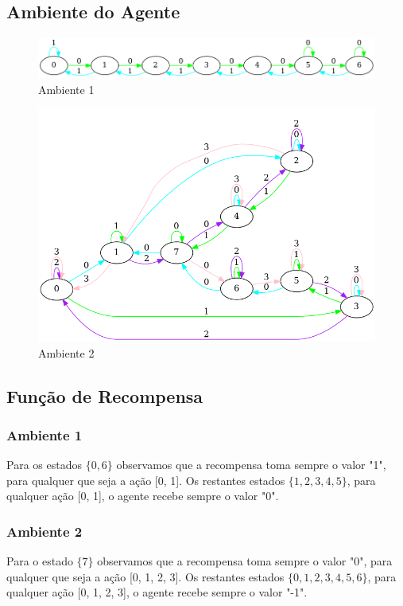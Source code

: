 \documentclass[9pt, a4paper, twocolumn]{article}
\begin{document}
\subsection{Ambiente do Agente}
\begin{figure}[h!]
	\includegraphics[scale=.3]{images/ex1.png}
	\caption{Ambiente 1}
	\label{fig:ex1}
\end{figure}
\begin{figure}[h!]
	\includegraphics[scale=.3]{images/ex2.png}
	\caption{Ambiente 2}
	\label{fig:ex1}
\end{figure}
\subsection{Função de Recompensa}
\subsubsection{Ambiente 1}
\hspace{10mm} Para os estados $\{0, 6\}$ observamos que a recompensa toma sempre o valor "1", para qualquer que seja a ação [0, 1]. Os restantes estados $\{1, 2, 3, 4, 5\}$, para qualquer ação [0, 1], o agente recebe sempre o valor "0". 
\subsubsection{Ambiente 2}
\hspace{10mm} Para o estado $\{7\}$ observamos que a recompensa toma sempre o valor "0", para qualquer que seja a ação [0, 1, 2, 3]. Os restantes estados $\{0, 1, 2, 3, 4, 5, 6\}$, para qualquer ação [0, 1, 2, 3], o agente recebe sempre o valor "-1".
\end{document}
